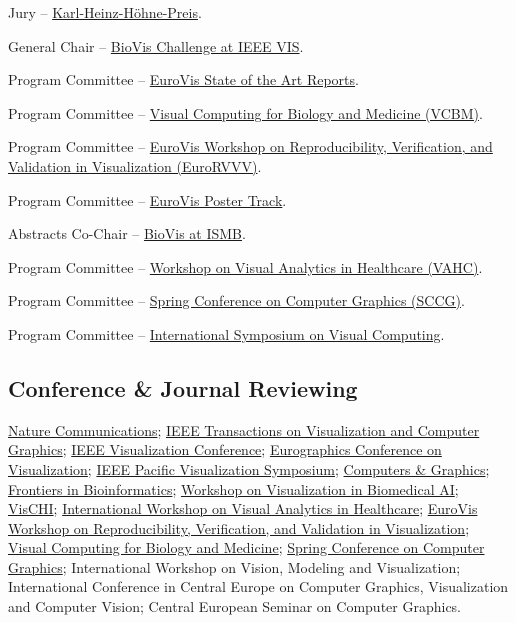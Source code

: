 \documentclass[10pt,a4paper,roman,final]{moderncv}
\begin{document}
\begin{description}[style=multiline,leftmargin=2.0cm,font=\normalfont]
\item[2021] Jury -- \href{https://medvis2021.re-mic.de/en/karl-heinz-hoehne-award/}{Karl-Heinz-Höhne-Preis}.
\item[2021, 2022] General Chair -- \href{http://www.biovis.net}{BioVis Challenge at IEEE VIS}.
\item[2020--2022] Program Committee -- \href{https://conferences.eg.org/egev20/}{EuroVis State of the Art Reports}.
\item[2018--2021] Program Committee -- \href{https://www.vcbm.org}{Visual Computing for Biology and Medicine (VCBM)}.
\item[2018] Program Committee -- \href{http://www.eurorvvv.org}{EuroVis Workshop on Reproducibility, Verification, and Validation in Visualization (EuroRVVV)}.
\item[2018--2020] Program Committee -- \href{https://conferences.eg.org/egev20/}{EuroVis Poster Track}.
\item[2018--2020] Abstracts Co-Chair -- \href{http://www.biovis.net}{BioVis at ISMB}.
\item[2017--2024] Program Committee -- \href{https://visualanalyticshealthcare.org}{Workshop on Visual Analytics in Healthcare (VAHC)}.
\item[2017] Program Committee -- \href{http://www.sccg.sk}{Spring Conference on Computer Graphics (SCCG)}.
\item[2013] Program Committee -- \href{http://www.isvc.net}{International Symposium on Visual Computing}.
\end{description}

\subsection*{Conference \& Journal Reviewing}
\href{https://www.nature.com/ncomms/}{Nature Communications};
\href{https://ieeexplore.ieee.org/xpl/RecentIssue.jsp?punumber=2945}{IEEE Transactions on Visualization and Computer Graphics};
\href{http://www.ieeevis.org}{IEEE Visualization Conference};
\href{https://diglib.eg.org/handle/10.2312/187}{Eurographics Conference on Visualization};
\href{http://ieeexplore.ieee.org/xpl/conhome.jsp?punumber=1001657}{IEEE Pacific Visualization Symposium};
\href{http://www.journals.elsevier.com/computers-and-graphics/}{Computers \& Graphics};
\href{https://www.frontiersin.org/journals/bioinformatics}{Frontiers in Bioinformatics};
\href{https://vis-biomed-ai.github.io/}{Workshop on Visualization in Biomedical AI};
\href{https://www.hbku.edu.qa/en/vischi}{VisCHI};
\href{http://visualanalyticshealthcare.org}{International Workshop on Visual Analytics in Healthcare};
\href{http://www.eurorvvv.org}{EuroVis Workshop on Reproducibility, Verification, and Validation in Visualization};
\href{https://lsi.ugr.es/vcbm2018}{Visual Computing for Biology and Medicine};
\href{http://www.sccg.sk}{Spring Conference on Computer Graphics};
International Workshop on Vision, Modeling and Visualization;
International Conference in Central Europe on Computer Graphics, Visualization and Computer Vision;
Central European Seminar on Computer Graphics.
\end{document}
